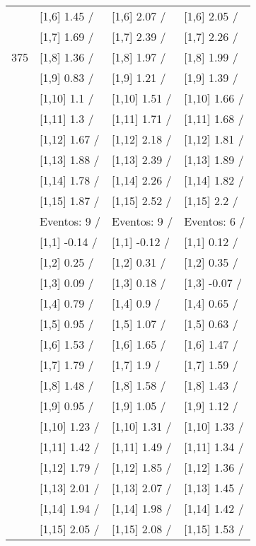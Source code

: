 \begin{table}
\begin{tabular}[t]{llll}
 & {}[1,6] 1.45  / & {}[1,6] 2.07  / & {}[1,6] 2.05  /\\
 & {}[1,7] 1.69  / & {}[1,7] 2.39  / & {}[1,7] 2.26  /\\
375 & {}[1,8] 1.36  / & {}[1,8] 1.97  / & {}[1,8] 1.99  /\\
\addlinespace
 & {}[1,9] 0.83  / & {}[1,9] 1.21  / & {}[1,9] 1.39  /\\
 & {}[1,10] 1.1  / & {}[1,10] 1.51  / & {}[1,10] 1.66  /\\
 & {}[1,11] 1.3  / & {}[1,11] 1.71  / & {}[1,11] 1.68  /\\
 & {}[1,12] 1.67  / & {}[1,12] 2.18  / & {}[1,12] 1.81  /\\
 & {}[1,13] 1.88  / & {}[1,13] 2.39  / & {}[1,13] 1.89  /\\
\addlinespace
 & {}[1,14] 1.78  / & {}[1,14] 2.26  / & {}[1,14] 1.82  /\\
 & {}[1,15] 1.87  / & {}[1,15] 2.52  / & {}[1,15] 2.2  /\\
 & Eventos:  9 / & Eventos:  9 / & Eventos:  6 /\\
 & {}[1,1] -0.14  / & {}[1,1] -0.12  / & {}[1,1] 0.12  /\\
 & {}[1,2] 0.25  / & {}[1,2] 0.31  / & {}[1,2] 0.35  /\\
\addlinespace
 & {}[1,3] 0.09  / & {}[1,3] 0.18  / & {}[1,3] -0.07  /\\
 & {}[1,4] 0.79  / & {}[1,4] 0.9  / & {}[1,4] 0.65  /\\
 & {}[1,5] 0.95  / & {}[1,5] 1.07  / & {}[1,5] 0.63  /\\
 & {}[1,6] 1.53  / & {}[1,6] 1.65  / & {}[1,6] 1.47  /\\
 & {}[1,7] 1.79  / & {}[1,7] 1.9  / & {}[1,7] 1.59  /\\
\addlinespace
500 & {}[1,8] 1.48  / & {}[1,8] 1.58  / & {}[1,8] 1.43  /\\
 & {}[1,9] 0.95  / & {}[1,9] 1.05  / & {}[1,9] 1.12  /\\
 & {}[1,10] 1.23  / & {}[1,10] 1.31  / & {}[1,10] 1.33  /\\
 & {}[1,11] 1.42  / & {}[1,11] 1.49  / & {}[1,11] 1.34  /\\
 & {}[1,12] 1.79  / & {}[1,12] 1.85  / & {}[1,12] 1.36  /\\
\addlinespace
 & {}[1,13] 2.01  / & {}[1,13] 2.07  / & {}[1,13] 1.45  /\\
 & {}[1,14] 1.94  / & {}[1,14] 1.98  / & {}[1,14] 1.42  /\\
 & {}[1,15] 2.05  / & {}[1,15] 2.08  / & {}[1,15] 1.53  /\\
\bottomrule
\end{tabular}
\end{table}
